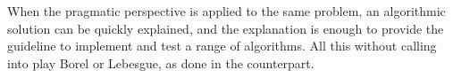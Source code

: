 \documentclass[]{scrartcl}
\theoremstyle{definition}
\begin{document}
When the pragmatic perspective is applied to the same problem, an algorithmic solution can be quickly explained, and the explanation is enough to provide the guideline to implement and test a range of algorithms. All this without calling into play Borel or Lebesgue, as done in the counterpart.

%
%
%
%
%




\end{document}
